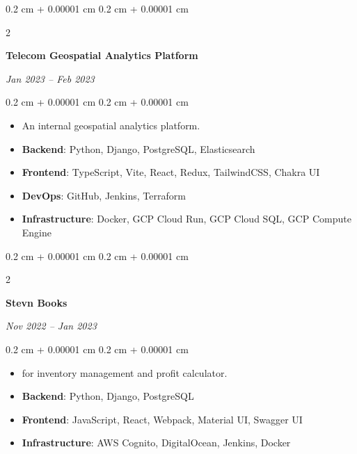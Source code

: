 \documentclass[10pt, a4paper]{article}
\newenvironment{highlights}{
    \begin{itemize}[
        topsep=0.10 cm,
        parsep=0.10 cm,
        partopsep=0pt,
        itemsep=0pt,
        leftmargin=0.4 cm + 10pt
    ]
}{
    \end{itemize}
} %
\newenvironment{onecolentry}{
    \begin{adjustwidth}{
        0.2 cm + 0.00001 cm
    }{
        0.2 cm + 0.00001 cm
    }
}{
    \end{adjustwidth}
} %
\newenvironment{twocolentry}[2][]{
    \onecolentry
    \def\secondColumn{#2}
    \setcolumnwidth{\fill, 4.5 cm}
    \begin{paracol}{2}
}{
    \switchcolumn \raggedleft \secondColumn
    \end{paracol}
    \endonecolentry
} %
\let\hrefWithoutArrow\href
\renewcommand{\href}[2]{\hrefWithoutArrow{#1}{\ifthenelse{\equal{#2}{}}{ }{#2 }\raisebox{.15ex}{\footnotesize \faExternalLink*}}}
\begin{document}
        \vspace{0.2 cm}

        \begin{twocolentry}{
            
            
        \textit{Jan 2023 – Feb 2023}}
            \textbf{Telecom Geospatial Analytics Platform}
        \end{twocolentry}

        \vspace{0.10 cm}
        \begin{onecolentry}
            \begin{highlights}
                \item An internal geospatial analytics platform.
                \item \textbf{Backend}: Python, Django, PostgreSQL, Elasticsearch
                \item \textbf{Frontend}: TypeScript, Vite, React, Redux, TailwindCSS, Chakra UI
                \item \textbf{DevOps}: GitHub, Jenkins, Terraform
                \item \textbf{Infrastructure}: Docker, GCP Cloud Run, GCP Cloud SQL, GCP Compute Engine
            \end{highlights}
        \end{onecolentry}


        \vspace{0.2 cm}

        \begin{twocolentry}{
            
            
        \textit{Nov 2022 – Jan 2023}}
            \textbf{Stevn Books}
        \end{twocolentry}

        \vspace{0.10 cm}
        \begin{onecolentry}
            \begin{highlights}
                \item \href{https://stevnbooks.com}{Web app} for inventory management and profit calculator.
                \item \textbf{Backend}: Python, Django, PostgreSQL
                \item \textbf{Frontend}: JavaScript, React, Webpack, Material UI, Swagger UI
                \item \textbf{Infrastructure}: AWS Cognito, DigitalOcean, Jenkins, Docker
            \end{highlights}
        \end{onecolentry}
\end{document}
